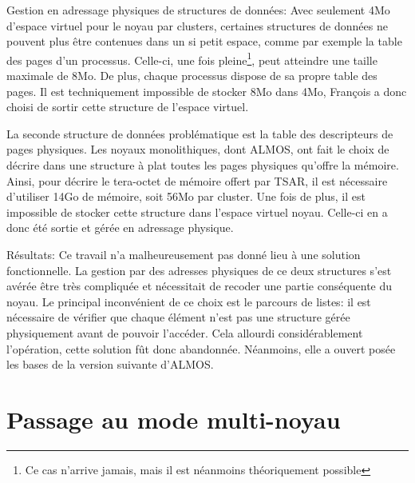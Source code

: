       \begin{paragraph}{Gestion en adressage physiques de structures de données:}
        Avec seulement 4Mo d'espace virtuel pour le noyau par clusters,
        certaines structures de données ne pouvent plus être contenues dans un
        si petit espace, comme par exemple la table des pages d'un
        processus. Celle-ci, une fois pleine\footnote{Ce cas n'arrive jamais,
          mais il est néanmoins théoriquement possible}, peut atteindre une
        taille maximale de 8Mo. De plus, chaque processus dispose de sa propre
        table des pages. Il est techniquement impossible de stocker 8Mo dans
        4Mo, François a donc choisi de sortir cette structure de l'espace
        virtuel.

        La seconde structure de données problématique est la table des
        descripteurs de pages physiques. Les noyaux monolithiques, dont ALMOS,
        ont fait le choix de décrire dans une structure à plat toutes les pages
        physiques qu'offre la mémoire. Ainsi, pour décrire le tera-octet de
        mémoire offert par TSAR, il est nécessaire d'utiliser 14Go de mémoire,
        soit 56Mo par cluster. Une fois de plus, il est impossible de stocker
        cette structure dans l'espace virtuel noyau. Celle-ci en a donc été
        sortie et gérée en adressage physique.
      \end{paragraph}

      \begin{paragraph}{Résultats:}
        Ce travail n'a malheureusement pas donné lieu à une solution
        fonctionnelle. La gestion par des adresses physiques de ce deux
        structures s'est avérée être très compliquée et nécessitait de recoder
        une partie conséquente du noyau. Le principal inconvénient de ce choix
        est le parcours de listes: il est nécessaire de vérifier que chaque
        élément n'est pas une structure gérée physiquement avant de pouvoir
        l'accéder. Cela allourdi considérablement l'opération, cette solution
        fût donc abandonnée. Néanmoins, elle a ouvert posée les bases de la
        version suivante d'ALMOS.
      \end{paragraph}

      
  \section{Passage au mode multi-noyau}
  \label{sec:multi-noyau}

